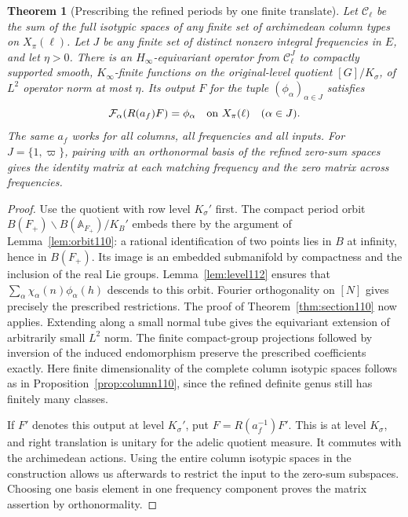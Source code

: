 \documentclass[a4paper,11pt]{article}
\newtheorem{theorem}[proposition]{Theorem}
\theoremstyle{definition}
\theoremstyle{remark}
\numberwithin{equation}{section}
\begin{document}
\begin{theorem}[Prescribing the refined periods by one finite translate]
\label{thm:onto112}
Let \(\mathcal C_\ell\) be the sum of the full isotypic spaces
of any finite set of archimedean column types on \(X_\pi(\ell)\).
Let \(J\) be any finite set of distinct nonzero integral
frequencies in \(E\), and let \(\eta>0\). There is an
\(H_\infty\)-equivariant operator from \(\mathcal C_\ell^J\)
to compactly supported smooth, \(K_\infty\)-finite functions
on the original-level quotient \([G]/K_\sigma\), of \(L^2\)
operator norm at most \(\eta\). Its output \(F\) for the tuple
\((\phi_\alpha)_{\alpha\in J}\) satisfies
\[
         {\cal F}_\alpha(R(a_f)F)=\phi_\alpha
                          \quad\hbox{on }X_\pi(\ell)\quad(\alpha\in J).
\]
The same \(a_f\) works for all columns, all frequencies and all
inputs. For \(J=\{1,\varpi\}\), pairing with an orthonormal
basis of the refined zero-sum spaces gives the identity matrix
at each matching frequency and the zero matrix across frequencies.
\end{theorem}
\begin{proof}
Use the quotient with row level \(K_\sigma'\) first. The compact
period orbit \(B(F_+)\backslash B(\mathbb A_{F_+})/K_B'\) embeds
there by the argument of Lemma~\ref{lem:orbit110}: a rational
identification of two points lies in \(B\) at infinity, hence in
\(B(F_+)\). Its image is an embedded submanifold by compactness
and the inclusion of the real Lie groups. Lemma~\ref{lem:level112}
ensures that \(\sum_\alpha\chi_\alpha(n)\phi_\alpha(h)\) descends
to this orbit. Fourier orthogonality on \([N]\) gives precisely
the prescribed restrictions. The proof of Theorem~\ref{thm:section110}
now applies. Extending along a small normal tube gives the
equivariant extension of arbitrarily small \(L^2\) norm.
The finite compact-group projections followed by inversion of
the induced endomorphism preserve the prescribed coefficients
exactly. Here finite dimensionality of the complete column
isotypic spaces follows as in Proposition~\ref{prop:column110},
since the refined definite genus still has finitely many classes.

If \(F'\) denotes this output at level \(K_\sigma'\), put
\(F=R(a_f^{-1})F'\). This is at level \(K_\sigma\), and right
translation is unitary for the adelic quotient measure. It
commutes with the archimedean actions. Using the entire column
isotypic spaces in the construction allows us afterwards to
restrict the input to the zero-sum subspaces. Choosing one
basis element in one frequency component proves the matrix
assertion by orthonormality.
\end{proof}
\end{document}
